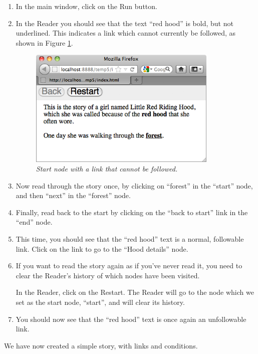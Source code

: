 \documentclass{article}
\begin{document}
\begin{enumerate}
  \item In the main window, click on the Run button.
  \item In the Reader you should see that the text ``red hood'' is bold,
  but not underlined. This indicates a link which cannot currently be
  followed, as shown in Figure \ref{fig:tut1:start_with_condition}.
 
\begin{figure}[ht]
  \centering
  \includegraphics[width=9cm]{images/hypedyn-tutorial-1-figure-15}
  \caption{\textit{Start node with a link that cannot be followed.}}
  \label{fig:tut1:start_with_condition}
\end{figure} 

\item Now read through the story once, by clicking on ``forest'' in the
``start'' node, and then ``next'' in the ``forest'' node.
\item Finally, read back to the start by clicking on the ``back to start'' link
in the ``end'' node.
\item This time, you should see that the ``red hood'' text is a normal,
followable link. Click on the link to go to the ``Hood details'' node.

\item If you want to read the story again as if you've never read it, you need
to clear the Reader's history of which nodes have been visited.

In the Reader, click on the Restart. The Reader will go to the node which
we set as the start node, ``start'', and will clear its history.

\item You should now see that the ``red hood'' text is once again an
unfollowable link.
\end{enumerate}

We have now created a simple story, with links and conditions.
\end{document}
